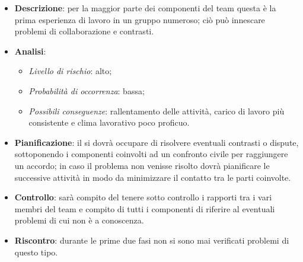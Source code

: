 			\begin{itemize}
				\item \textbf{Descrizione}: per la maggior parte dei componenti del team questa è la prima esperienza di lavoro in un gruppo numeroso; ciò può  innescare problemi di collaborazione e contrasti.
				\item \textbf{Analisi}:
				\begin{itemize}
					\item \textit{Livello di rischio}: alto;
					\item \textit{Probabilità di occorrenza}: bassa;
					\item \textit{Possibili conseguenze}: rallentamento delle attività, carico di lavoro più consistente e clima lavorativo poco proficuo.
				\end{itemize}
				\item \textbf{Pianificazione}: il  si dovrà occupare di risolvere eventuali contrasti o dispute, sottoponendo i componenti coinvolti ad un confronto civile per raggiungere un accordo; in caso il problema non venisse risolto dovrà pianificare le successive attività in modo da minimizzare il contatto tra le parti coinvolte.
				\item \textbf{Controllo}: sarà compito del  tenere sotto controllo i rapporti tra i vari membri del team e compito di tutti i componenti di riferire al  eventuali problemi di cui non è a conoscenza.
				\item \textbf{Riscontro}: durante le prime due fasi non si sono mai verificati problemi di questo tipo.
			\end{itemize}

